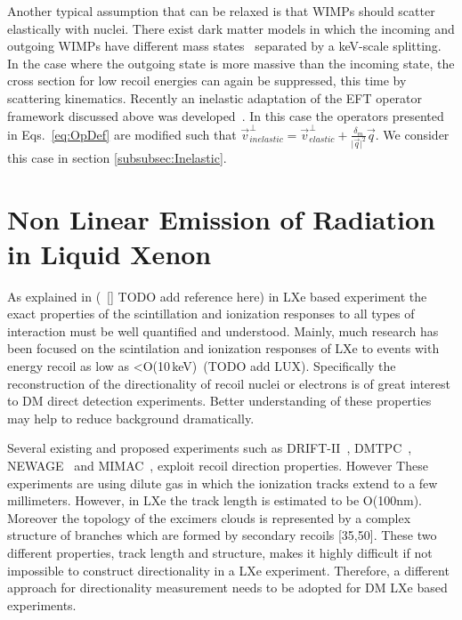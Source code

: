 	    Another typical assumption that can be relaxed is that WIMPs should scatter elastically with nuclei. There exist dark matter models in which the incoming and outgoing WIMPs have different mass states~\cite{InelasticIntro} separated by a keV-scale splitting. In the case where the outgoing state is more massive than the incoming state, the cross section for low recoil energies can again be suppressed, this time by scattering kinematics. Recently an inelastic adaptation of the EFT operator framework discussed above was developed~\cite{InelasticMath}. In this case the operators presented in Eqs.~\ref{eq:OpDef} are modified such that $\vec{v}^\perp_{inelastic} = \vec{v}^\perp_{elastic} +\frac{\delta_m}{\vert{\vec{q}}\vert^2}\vec{q}$. We consider this case in section \ref{subsubsec:Inelastic}.


\section{Non Linear Emission of Radiation in Liquid Xenon}
\label{sec:intro_superradiance}
As explained in (~\ref{} TODO add reference here) in LXe based experiment the exact properties of the scintillation and ionization responses to all types of interaction must be well quantified and understood. Mainly, much research has been focused on the scintilation and ionization responses of LXe to events with energy recoil as low as <O(10\,keV)~\cite{Manzur:2009hp,Aprile:2012an,Baudis:2013cca}(TODO add LUX).
Specifically the reconstruction of the directionality of recoil nuclei or electrons is of great interest to DM direct detection experiments. Better understanding of these properties may help to reduce background dramatically.

Several existing and proposed experiments such as DRIFT-II~\cite{Muna:2007zz}, DMTPC~\cite{Deaconu:2017vam}, NEWAGE~\cite{Yakabe:2016pjh} and MIMAC~\cite{Riffard:2016mgw}, exploit recoil direction properties. However These experiments are using dilute gas in which the ionization tracks extend to a few millimeters. However, in LXe the track length is estimated to be O(100nm). Moreover the topology of the excimers clouds is represented by a complex structure of branches which are formed by secondary recoils [35,50]. These two different properties, track length and structure, makes it highly difficult if not impossible to construct directionality in a LXe experiment. Therefore, a different approach for directionality measurement needs to be adopted for DM LXe based experiments.


